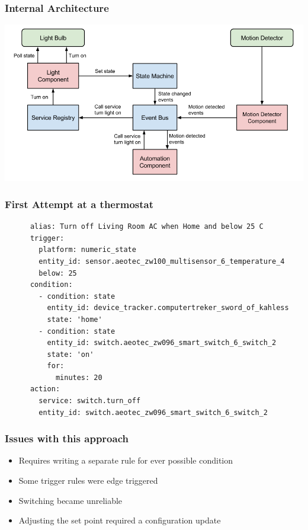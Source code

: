 \documentclass[aspectratio=169,11pt,hyperref={colorlinks=true}]{beamer}
\begin{document}
\begin{frame}
    \frametitle{Internal Architecture}
    \includegraphics[width=\textwidth]{state_machine.png}
\end{frame}

\begin{frame}[fragile=singleslide]
    \frametitle{First Attempt at a thermostat}
    \begin{verbatim}
      alias: Turn off Living Room AC when Home and below 25 C
      trigger:
        platform: numeric_state
        entity_id: sensor.aeotec_zw100_multisensor_6_temperature_4
        below: 25
      condition:
        - condition: state
          entity_id: device_tracker.computertreker_sword_of_kahless
          state: 'home'
        - condition: state
          entity_id: switch.aeotec_zw096_smart_switch_6_switch_2
          state: 'on'
          for:
            minutes: 20
      action:
        service: switch.turn_off
        entity_id: switch.aeotec_zw096_smart_switch_6_switch_2
    \end{verbatim}
\end{frame}

\begin{frame}
    \frametitle{Issues with this approach}
    \begin{itemize}
        \item Requires writing a separate rule for ever possible condition
        \item Some trigger rules were edge triggered
        \item Switching became unreliable
        \item Adjusting the set point required a configuration update
    \end{itemize}
\end{frame}
\end{document}
